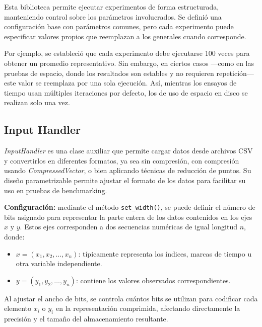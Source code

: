 Esta biblioteca permite ejecutar experimentos de forma estructurada, manteniendo control sobre los parámetros involucrados. Se definió una configuración base con parámetros comunes, pero cada experimento puede especificar valores propios que reemplazan a los generales cuando corresponde.

Por ejemplo, se estableció que cada experimento debe ejecutarse 100 veces para obtener un promedio representativo. Sin embargo, en ciertos casos —como en las pruebas de espacio, donde los resultados son estables y no requieren repetición— este valor se reemplaza por una sola ejecución. Así, mientras los ensayos de tiempo usan múltiples iteraciones por defecto, los de uso de espacio en disco se realizan solo una vez.

\subsection{Input Handler}

\textit{InputHandler} es una clase auxiliar que permite cargar datos desde archivos CSV y convertirlos en diferentes formatos, ya sea sin compresión, con compresión usando \textit{CompressedVector}, o bien aplicando técnicas de reducción de puntos. Su diseño parametrizable permite ajustar el formato de los datos para facilitar su uso en pruebas de benchmarking.

\vspace{0.5em}
\textbf{Configuración:} mediante el método \texttt{set\_width()}, se puede definir el número de bits asignado para representar la parte entera de los datos contenidos en los ejes \( x \) y \( y \). Estos ejes corresponden a dos secuencias numéricas de igual longitud \( n \), donde:

\begin{itemize}
    \item \( x = (x_1, x_2, \dots, x_n) \): típicamente representa los índices, marcas de tiempo u otra variable independiente.
    \item \( y = (y_1, y_2, \dots, y_n) \): contiene los valores observados correspondientes.
\end{itemize}

Al ajustar el ancho de bits, se controla cuántos bits se utilizan para codificar cada elemento \( x_i \) o \( y_i \) en la representación comprimida, afectando directamente la precisión y el tamaño del almacenamiento resultante.

